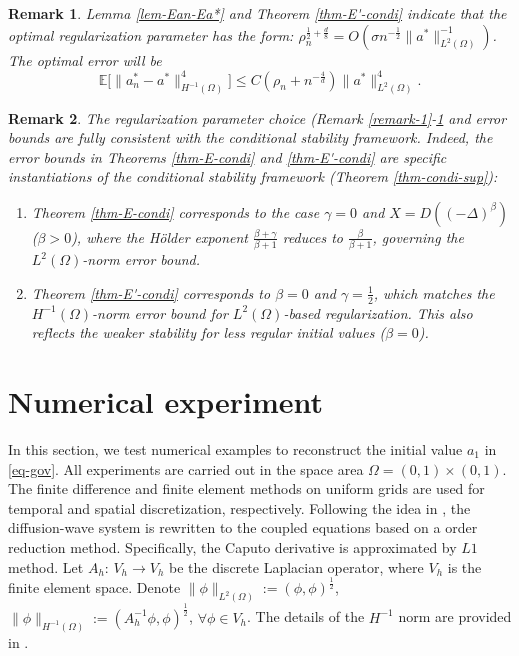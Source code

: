 \documentclass[11pt]{article}
\newtheorem{remark}{Remark}[section]
\numberwithin{equation}{section}
\begin{document}
\begin{remark}
\label{remark-2}
Lemma \ref{lem-Ean-Ea*} and Theorem \ref{thm-E'-condi} indicate that the optimal regularization parameter has the form: $\rho_n^{\frac12 + \frac{d}8} = O(\sigma n^{-\frac12} \|a^*\|^{-1}_{L^2(\Omega)})$. The optimal error will be
\[
\mathbb{E} \bigl[ \| a_n^* - a^* \|^{4}_{H^{-1}(\Omega)} \bigr]\le C \left(\rho_n+ n^{-\frac4d} \right) \| a^* \|^4_{L^2(\Omega)}.
\]
\end{remark}
\begin{remark}
The regularization parameter choice (Remark \ref{remark-1}-\ref{remark-2} and error bounds are fully consistent with the conditional stability framework. Indeed, the error bounds in Theorems \ref{thm-E-condi} and \ref{thm-E'-condi} are specific instantiations of the conditional stability framework (Theorem \ref{thm-condi-sup}):
\begin{enumerate}
    \item Theorem \ref{thm-E-condi} corresponds to the case $\gamma = 0$ and $ X = D((-\Delta)^\beta) $ ($ \beta > 0 $), where the H\"older exponent $ \frac{\beta+\gamma}{\beta+1} $ reduces to $ \frac{\beta}{\beta+1} $, governing the $ L^2(\Omega) $-norm error bound.
    \item Theorem \ref{thm-E'-condi} corresponds to $ \beta = 0 $ and $ \gamma = \frac{1}{2} $, which matches the  $ H^{-1}(\Omega) $-norm error bound for $ L^2(\Omega) $-based regularization. This also reflects the weaker stability for less regular initial values ($\beta=0$).
\end{enumerate}
\end{remark}

\section{Numerical experiment}
In this section, we test numerical examples to reconstruct the initial value $a_1$ in \eqref{eq-gov}. All experiments are carried out in the space area $\Omega=(0,1)\times(0,1)$. The finite difference and finite element methods on uniform grids are used for temporal and spatial discretization, respectively. Following the idea in \cite{Sun2006ANM}, the diffusion-wave system is rewritten to the coupled equations based on a order reduction method. Specifically, the Caputo derivative is approximated by $L1$ method.  Let $A_h$: $V_h\rightarrow V_h$ be the discrete Laplacian operator, where $V_h$ is the finite element space. Denote $\|\phi\|_{L^2(\Omega)}:=(\phi,\phi)^{\frac12}$, $\|\phi\|_{H^{-1}(\Omega)}:=(A_h^{-1}\phi,\phi)^{\frac12}$, $\forall\phi \in V_h$.  The details of the $H^{-1}$ norm are provided in \cite{Hu2007ACM,Zou2019NMTMA}.
\end{document}
